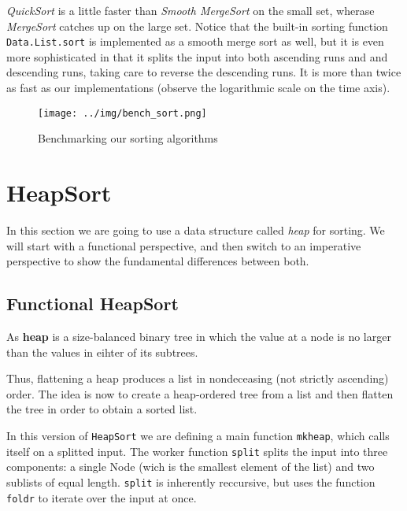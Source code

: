 \emph{QuickSort} is a little faster than \emph{Smooth MergeSort} on the small set, wherase \emph{MergeSort} catches up on the large set.
Notice that the built-in sorting function \texttt{Data.List.sort} is implemented as a smooth merge sort as well, but it is even more sophisticated in that it splits the input into both ascending runs and and descending runs, taking care to reverse the descending runs.
It is more than twice as fast as our implementations (observe the logarithmic scale on the time axis). 

\begin{figure}[ht]
\centering
\texttt{[image: ../img/bench\_sort.png]}
\caption[Sorting benchmarks]{Benchmarking our sorting algorithms}
\end{figure}

\section{HeapSort}

In this section we are going to use a data structure called \emph{heap} for sorting. We will start with a functional perspective, and then switch to an imperative perspective to show the fundamental differences between both.

\subsection{Functional HeapSort}

\begin{defn}[Heap]
As \textbf{heap} is a size-balanced binary tree in which the value at a node is no larger than the values in eihter of its subtrees.
\end{defn}

Thus, flattening a heap produces a list in nondeceasing (not strictly ascending) order.
The idea is now to create a heap-ordered tree from a list and then flatten the tree in order to obtain a sorted list.

\begin{impl}
In this version of \texttt{HeapSort} we are defining a main function \texttt{mkheap}, which calls itself on a splitted input.
The worker function \texttt{split} splits the input into three components: a single Node (wich is the smallest element of the list) and two sublists of equal length.
\texttt{split} is inherently reccursive, but uses the function \texttt{foldr} to iterate over the input at once.
\end{impl}

